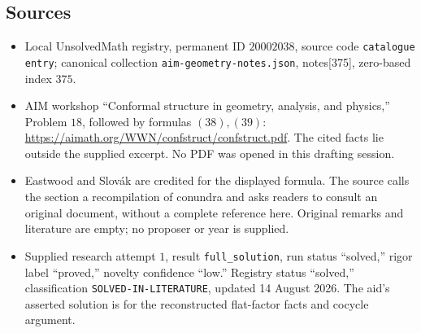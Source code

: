 \documentclass[11pt]{article}
\begin{document}
\subsection{Sources}
\begin{itemize}
\item Local UnsolvedMath registry, permanent ID \(20002038\), source code \texttt{catalogue entry}; canonical collection \texttt{aim-geometry-notes.json}, notes[375], zero-based index \(375\).
\item AIM workshop ``Conformal structure in geometry, analysis, and physics,'' Problem \(18\), followed by formulas \((38),(39)\): \url{https://aimath.org/WWN/confstruct/confstruct.pdf}. The cited facts lie outside the supplied excerpt. No PDF was opened in this drafting session.
\item Eastwood and Slov\'ak are credited for the displayed formula. The source calls the section a recompilation of conundra and asks readers to consult an original document, without a complete reference here. Original remarks and literature are empty; no proposer or year is supplied.
\item Supplied research attempt \(1\), result \texttt{full\_solution}, run status ``solved,'' rigor label ``proved,'' novelty confidence ``low.'' Registry status ``solved,'' classification \texttt{SOLVED-IN-LITERATURE}, updated 14 August 2026. The aid's asserted solution is for the reconstructed flat-factor facts and cocycle argument.
\end{itemize}
\end{document}
